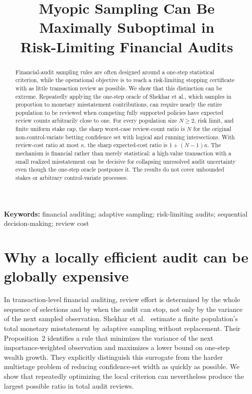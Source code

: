 \documentclass[11pt]{article}
\title{Myopic Sampling Can Be Maximally Suboptimal in\\Risk-Limiting Financial Audits}
\author{}
\date{}
\begin{document}
\maketitle
\begin{abstract}
Financial-audit sampling rules are often designed around a one-step statistical
criterion, while the operational objective is to reach a risk-limiting stopping
certificate with as little transaction review as possible. We show that this
distinction can be extreme. Repeatedly applying the one-step oracle of Shekhar
et al., which samples in proportion to monetary misstatement contributions,
can require nearly the entire population to be reviewed when competing fully
supported policies have expected review counts arbitrarily close to one. For
every population size $N\ge2$, risk limit, and finite uniform stake cap, the
sharp worst-case review-count ratio is $N$ for the original
non-control-variate betting confidence set with logical and running
intersections. With review-cost ratio at most $\kappa$, the sharp expected-cost
ratio is $1+(N-1)\kappa$. The mechanism is financial rather than merely
statistical: a high-value transaction with a small realized misstatement can
be decisive for collapsing unresolved audit uncertainty even though the
one-step oracle postpones it. The results do not cover unbounded stakes or
arbitrary control-variate processes.
\end{abstract}

\noindent\textbf{Keywords:} financial auditing; adaptive sampling;
risk-limiting audits; sequential decision-making; review cost

\section{Why a locally efficient audit can be globally expensive}
In transaction-level financial auditing, review effort is determined by the
whole sequence of selections and by when the audit can stop, not only by the
variance of the next sampled observation. Shekhar et al.~\cite{shekhar2023}
estimate a finite population's total monetary misstatement by adaptive
sampling without replacement. Their Proposition~2 identifies a rule that
minimizes the variance of the next importance-weighted observation and
maximizes a lower bound on one-step wealth growth. They explicitly distinguish
this surrogate from the harder multistage problem of reducing confidence-set
width as quickly as possible. We show that repeatedly optimizing the local
criterion can nevertheless produce the largest possible ratio in total audit
reviews.
\end{document}
